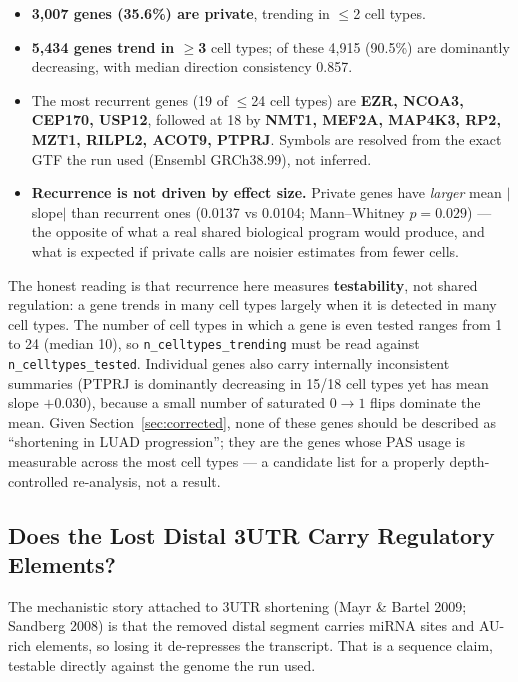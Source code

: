 \documentclass[11pt,a4paper]{article}
\begin{document}
\begin{itemize}
  \item \textbf{3,007 genes (35.6\%) are private}, trending in $\leq$2 cell types.
  \item \textbf{5,434 genes trend in $\geq$3} cell types; of these 4,915 (90.5\%) are
    dominantly decreasing, with median direction consistency 0.857.
  \item The most recurrent genes (19 of $\leq$24 cell types) are \textbf{EZR, NCOA3,
    CEP170, USP12}, followed at 18 by \textbf{NMT1, MEF2A, MAP4K3, RP2, MZT1,
    RILPL2, ACOT9, PTPRJ}. Symbols are resolved from the exact GTF the run used
    (Ensembl GRCh38.99), not inferred.
  \item \textbf{Recurrence is not driven by effect size.} Private genes have
    \emph{larger} mean $|$slope$|$ than recurrent ones (0.0137 vs 0.0104;
    Mann--Whitney $p = 0.029$) --- the opposite of what a real shared biological
    program would produce, and what is expected if private calls are noisier
    estimates from fewer cells.
\end{itemize}

The honest reading is that recurrence here measures \textbf{testability}, not shared
regulation: a gene trends in many cell types largely when it is detected in many cell
types. The number of cell types in which a gene is even tested ranges from 1 to 24
(median 10), so \texttt{n\_celltypes\_trending} must be read against
\texttt{n\_celltypes\_tested}. Individual genes also carry internally inconsistent
summaries (PTPRJ is dominantly decreasing in 15/18 cell types yet has mean slope
$+0.030$), because a small number of saturated $0\rightarrow1$ flips dominate the
mean. Given Section~\ref{sec:corrected}, none of these genes should be described as
``shortening in LUAD progression''; they are the genes whose PAS usage is measurable
across the most cell types --- a candidate list for a properly depth-controlled
re-analysis, not a result.

\subsection{Does the Lost Distal 3\textquotesingle{}UTR Carry Regulatory Elements?}

The mechanistic story attached to 3\textquotesingle{}UTR shortening (Mayr \& Bartel
2009; Sandberg 2008) is that the removed distal segment carries miRNA sites and
AU-rich elements, so losing it de-represses the transcript. That is a sequence
claim, testable directly against the genome the run used.
\end{document}
